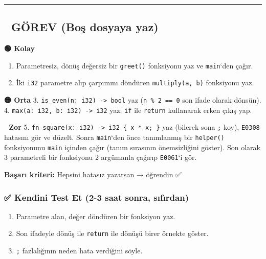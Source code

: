 \documentclass[12pt,a4paper]{article}
\begin{document}
\begin{center}\rule{0.5\linewidth}{0.5pt}\end{center}

\subsection{📝 GÖREV (Boş dosyaya yaz)}\label{görev-boş-dosyaya-yaz-8}

\textbf{🟢 Kolay}

\begin{enumerate}
\def\labelenumi{\arabic{enumi}.}
\tightlist
\item
  Parametresiz, dönüş değersiz bir \texttt{greet()} fonksiyonu yaz ve \texttt{main}`den çağır.
\item
  İki \texttt{i32} parametre alıp çarpımını döndüren \texttt{multiply(a,\ b)} fonksiyonu yaz.
\end{enumerate}

\textbf{🟡 Orta}
3. \texttt{is\_even(n:\ i32)\ -\textgreater{}\ bool} yaz (\texttt{n\ \%\ 2\ ==\ 0} son ifade olarak dönsün).
4. \texttt{max(a:\ i32,\ b:\ i32)\ -\textgreater{}\ i32} yaz; \texttt{if} ile \texttt{return} kullanarak erken çıkış yap.

\textbf{🔴 Zor}
5. \texttt{fn\ square(x:\ i32)\ -\textgreater{}\ i32\ \{\ x\ *\ x;\ \}} yaz (bilerek sona \texttt{;} koy), \texttt{E0308} hatasını gör ve düzelt. Sonra \texttt{main}`den önce tanımlanmış bir \texttt{helper()} fonksiyonunu \texttt{main} içinden çağır (tanım sırasının önemsizliğini göster). Son olarak 3 parametreli bir fonksiyonu 2 argümanla çağırıp \texttt{E0061}`i gör.

\textbf{Başarı kriteri:} Hepsini hatasız yazarsan → öğrendin ✅

\subsubsection{✅ Kendini Test Et (2-3 saat sonra, sıfırdan)}\label{kendini-test-et-2-3-saat-sonra-sıfırdan-9}

\begin{enumerate}
\def\labelenumi{\arabic{enumi}.}
\tightlist
\item
  Parametre alan, değer döndüren bir fonksiyon yaz.
\item
  Son ifadeyle dönüş ile \texttt{return} ile dönüşü birer örnekte göster.
\item
  \texttt{;} fazlalığının neden hata verdiğini söyle.
\end{enumerate}
\end{document}
